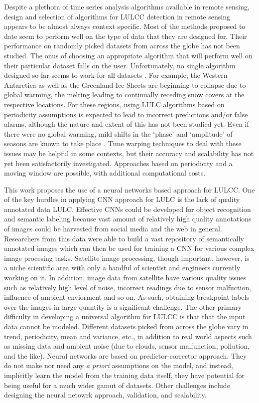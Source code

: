 \documentclass[a4paper,11pt]{article}
\begin{document}
Despite a plethora of time series analysis algorithms available in 
remote sensing, design and selection of algorithms for LULCC detection in remote
sensing appears to be almost always context specific. Most of the methods
proposed to date seem to perform well on the type of data that they are designed
for. Their performance on randomly picked datasets from across the
globe has not been studied. The onus of choosing an appropriate algorithm that
will perform well on their particular dataset falls on the user.
Unfortunately, no single algorithm designed so far seems to work for all
datasets \cite{lcmsCohen}. For example, the Western Antarctica as 
well as the Greenland Ice Sheets are beginning to collapse due to global warming, 
the melting leading to continually receding snow covers
at the respective locations. For these regions, using LULC algorithms based on
periodicity assumptions is expected to lead to incorrect predictions and/or false
alarms, although the nature and extent of this has not been studied yet.
Even if there were no global warming, mild shifts in the `phase' and `amplitude'
of seasons are known to take place \cite{petitjeanC}. Time warping techniques
\cite{petitjeanC} to deal with these issues may be helpful in some contexts, but
their accuracy and scalability has not yet been satisfactorily investigated.
Approaches based on periodicity and a moving window are possible, with 
additional computational costs.



This work proposes the use of a neural networks based approach for LULCC. 
One of the key hurdles in applying CNN approach for LULC is the lack of
quality annotated data LULC. Effective CNNs could be developed for
object recognition and semantic labeling because
vast amount of relatively high quality annotations of images could be harvested
from social media and the web in general.
Researchers from this data were able to build a  vast repository of semantically
annotated images which can then be used for training a CNN for various
complex image procesing tasks. Satellite image processing, though important, however, is a
niche scientific area with only a handful of scientist and engineers currently working on it.
In addition, image data from satellite  have various quality issues
such as relatively high level of noise, incorrect readings due to sensor malfuction,
influence of ambient enviorment and so on.
As such, obtaining breakpoint labels over the images in large quantity is a significant challenge.
The other primary difficulty in developing a universal algorithm for LULCC is that
that the input data cannot be modeled. Different datasets picked from across
the globe vary in trend, periodicity, mean and variance, etc., in addition to
real world aspects such as missing data and ambient noise (due to clouds,
sensor malfunction, pollution, and the like). Neural networks are based
on predictor-corrector approach. They do not make nor need any {\it a priori}
assumptions on the model, and instead, implicitly learn the model from the
training data itself, they have potential for being useful for a much wider
gamut of datasets. 
Other challenges include designing the neural netowrk approach, validation,
and scalability.
\end{document}
